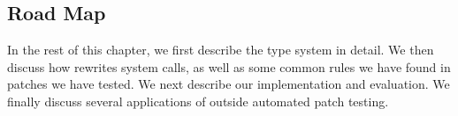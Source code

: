 \subsection{Road Map}
In the rest of this chapter, we first describe the \tachyon type system in detail. We
then discuss how \tachyon rewrites system calls, as well as some
common rules we have found in patches we have tested. We next describe
our implementation and evaluation. We finally discuss several
applications of \tachyon outside automated patch testing.


